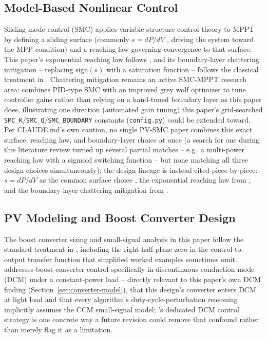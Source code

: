 \subsection{Model-Based Nonlinear Control}
Sliding mode control (SMC) applies variable-structure control theory
\cite{utkin1977variable} to MPPT by defining a sliding surface (commonly
$s = dP/dV$ \cite{ahmad2020application}, driving the system toward the MPP condition) and a reaching
law governing convergence to that surface. This paper's exponential
reaching law follows \cite{gao1993variable}, and its boundary-layer
chattering mitigation -- replacing $\mathrm{sign}(s)$ with a saturation
function -- follows the classical treatment in \cite{slotine1991applied}.
Chattering mitigation remains an active SMC-MPPT research area:
\cite{liu2025photovoltaic} combines PID-type SMC with an improved grey
wolf optimizer to tune controller gains rather than relying on a
hand-tuned boundary layer as this paper does, illustrating one direction
(automated gain tuning) this paper's grid-searched
\texttt{SMC\_K}/\texttt{SMC\_Q}/\texttt{SMC\_BOUNDARY} constants
(\texttt{config.py}) could be extended toward. Per CLAUDE.md's own caution,
no single PV-SMC paper combines this exact surface, reaching law, and
boundary-layer choice at once (a search for one during this literature
review turned up several partial matches -- e.g.\ a multi-power reaching
law with a sigmoid switching function -- but none matching all three
design choices simultaneously); the design lineage is instead cited
piece-by-piece: $s=dP/dV$ as the common surface choice
\cite{ahmad2020application}, the exponential reaching law from
\cite{gao1993variable}, and the boundary-layer chattering mitigation from
\cite{slotine1991applied}.

\subsection{PV Modeling and Boost Converter Design}
The boost converter sizing and small-signal analysis in this paper follow
the standard treatment in \cite{erickson2001fundamentals}, including the
right-half-plane zero in the control-to-output transfer function that
simplified worked examples sometimes omit. \cite{serra2024control}
addresses boost-converter control specifically in discontinuous conduction
mode (DCM) under a constant-power load -- directly relevant to this
paper's own DCM finding (Section~\ref{sec:converter-model}), that this
design's converter enters DCM at light load and that every algorithm's
duty-cycle-perturbation reasoning implicitly assumes the CCM small-signal
model; \cite{serra2024control}'s dedicated DCM control strategy is one
concrete way a future revision could remove that confound rather than
merely flag it as a limitation.

